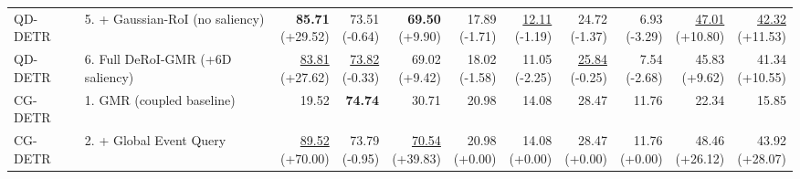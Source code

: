 \documentclass{article}
\begin{document}
{\begin{tabular}{llrrrrrrrrr}
QD-DETR & 5. + Gaussian-RoI (no saliency) & \shortstack{\textbf{85.71} \\ {\scriptsize (+29.52)}} & \shortstack{73.51 \\ {\scriptsize (-0.64)}} & \shortstack{\textbf{69.50} \\ {\scriptsize (+9.90)}} & \shortstack{17.89 \\ {\scriptsize (-1.71)}} & \shortstack{\underline{12.11} \\ {\scriptsize (-1.19)}} & \shortstack{24.72 \\ {\scriptsize (-1.37)}} & \shortstack{6.93 \\ {\scriptsize (-3.29)}} & \shortstack{\underline{47.01} \\ {\scriptsize (+10.80)}} & \shortstack{\underline{42.32} \\ {\scriptsize (+11.53)}} \\
QD-DETR & 6. Full DeRoI-GMR (+6D saliency) & \shortstack{\underline{83.81} \\ {\scriptsize (+27.62)}} & \shortstack{\underline{73.82} \\ {\scriptsize (-0.33)}} & \shortstack{69.02 \\ {\scriptsize (+9.42)}} & \shortstack{18.02 \\ {\scriptsize (-1.58)}} & \shortstack{11.05 \\ {\scriptsize (-2.25)}} & \shortstack{\underline{25.84} \\ {\scriptsize (-0.25)}} & \shortstack{7.54 \\ {\scriptsize (-2.68)}} & \shortstack{45.83 \\ {\scriptsize (+9.62)}} & \shortstack{41.34 \\ {\scriptsize (+10.55)}} \\
\midrule
CG-DETR & 1. GMR (coupled baseline) & 19.52 & \textbf{74.74} & 30.71 & 20.98 & 14.08 & 28.47 & 11.76 & 22.34 & 15.85 \\
CG-DETR & 2. + Global Event Query & \shortstack{\underline{89.52} \\ {\scriptsize (+70.00)}} & \shortstack{73.79 \\ {\scriptsize (-0.95)}} & \shortstack{\underline{70.54} \\ {\scriptsize (+39.83)}} & \shortstack{20.98 \\ {\scriptsize (+0.00)}} & \shortstack{14.08 \\ {\scriptsize (+0.00)}} & \shortstack{28.47 \\ {\scriptsize (+0.00)}} & \shortstack{11.76 \\ {\scriptsize (+0.00)}} & \shortstack{48.46 \\ {\scriptsize (+26.12)}} & \shortstack{43.92 \\ {\scriptsize (+28.07)}} \\

\end{tabular}}
\end{document}
